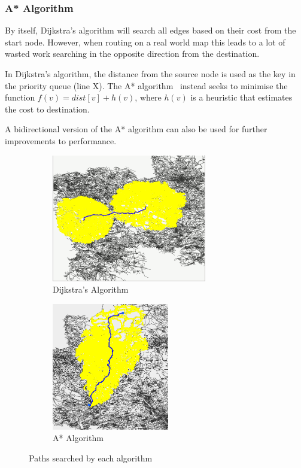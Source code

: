 \documentclass[ %
                    author={Alexander Hill},
                supervisor={Dr. Benjamin Sach},
                    degree={MEng},
                     title={MARMOSET},
                  subtitle={Multi-Agent Route Management using Online Simulation for Efficient Transportation},
                      type={research},
                      year={2016} ]{dissertation}
\begin{document}
\subsubsection{A* Algorithm}

By itself, Dijkstra's algorithm will search all edges based on their cost from
the start node. However, when routing on a real world map this leads to a lot of
wasted work searching in the opposite direction from the destination.

In Dijkstra's algorithm, the distance from the source node is used as the key in
the priority queue (line X). The A* algorithm~\cite{astar} instead seeks to minimise the
function $f(v) = dist[v] + h(v)$, where $h(v)$ is a heuristic that estimates the
cost to destination.

A bidirectional version of the A* algorithm can also be used for further
improvements to performance.

\begin{figure}[h]
\centering
\begin{subfigure}[b]{0.4\textwidth}
    \centering
    \includegraphics[height=15em]{bidijkstra-city}
    \caption{Dijkstra's Algorithm}\label{fig:bidijkstra}
\end{subfigure}
\hspace{2em}
\begin{subfigure}[b]{0.4\textwidth}
    \centering
    \includegraphics[height=15em]{astar-city}
    \caption{A* Algorithm}\label{fig:astar}
\end{subfigure}
\caption{Paths searched by each algorithm}
\end{figure}
\end{document}
